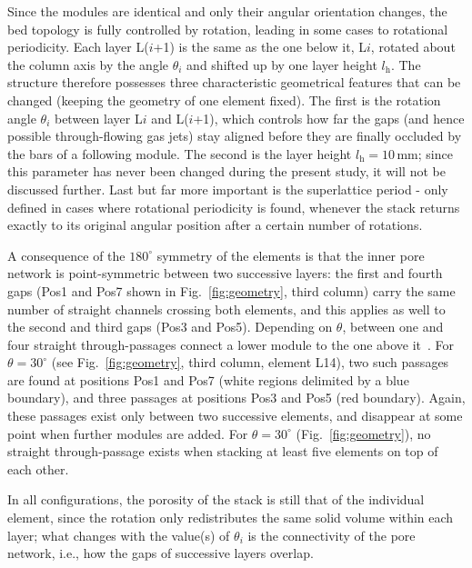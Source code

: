 Since the modules are identical and only their angular orientation changes, the bed topology is fully controlled by rotation, leading in some cases to rotational periodicity. Each layer L($i$+1) is the same as the one below it, L$i$, rotated about the column axis by the angle $\theta_i$ and shifted up by one layer height $l_\mathrm{h}$. The structure therefore possesses three characteristic geometrical features that can be changed (keeping the geometry of one element fixed). The first is the rotation angle $\theta_i$ between layer L$i$ and L($i$+1), which controls how far the gaps (and hence possible through-flowing gas jets) stay aligned before they are finally occluded by the bars of a following module. The second is the layer height $l_\mathrm{h}=10\,\mathrm{mm}$; since this parameter has never been changed during the present study, it will not be discussed further. Last but far more important is the superlattice period - only defined in cases where rotational periodicity is found, whenever the stack returns exactly to its original angular position after a certain number of rotations.

A consequence of the $180^\circ$ symmetry of the elements is that the inner pore network is point-symmetric between two successive layers: the first and fourth gaps (Pos1 and Pos7 shown in Fig.~\ref{fig:geometry}, third column) carry the same number of straight channels crossing both elements, and this applies as well to the second and third gaps (Pos3 and Pos5). Depending on $\theta$, between one and four straight through-passages connect a lower module to the one above it~\cite{velten2026}. For $\theta=30^\circ$ (see Fig.~\ref{fig:geometry}, third column, element L14), two such passages are found at positions Pos1 and Pos7 (white regions delimited by a blue boundary), and three passages at positions Pos3 and Pos5 (red boundary). Again, these passages exist only between two successive elements, and disappear at some point when further modules are added. For $\theta=30^\circ$ (Fig.~\ref{fig:geometry}), no straight through-passage exists when stacking at least five elements on top of each other.

In all configurations, the porosity of the stack is still that of the individual element, since the rotation only redistributes the same solid volume within each layer; what changes with the value(s) of $\theta_i$ is the connectivity of the pore network, i.e., how the gaps of successive layers overlap.

